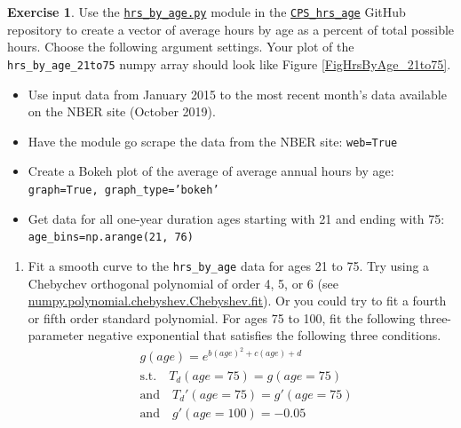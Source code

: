 \documentclass[letterpaper,12pt]{article}
\theoremstyle{definition}
\newtheorem{exercise}[theorem]{Exercise}
\begin{document}
  \begin{exercise}\label{ExCPShrs}
    Use the \href{https://github.com/OpenSourceEcon/CPS_hrs_age/blob/master/hrs_by_age.py}{\texttt{hrs\_by\_age.py}} module in the \href{https://github.com/OpenSourceEcon/CPS_hrs_age}{\texttt{CPS\_hrs\_age}} GitHub repository to create a vector of average hours by age as a percent of total possible hours. Choose the following argument settings. Your plot of the \texttt{hrs\_by\_age\_21to75} numpy array should look like Figure \ref{FigHrsByAge_21to75}.
    \begin{itemize}
      \item Use input data from January 2015 to the most recent month's data available on the NBER site (October 2019).
      \item Have the module go scrape the data from the NBER site: \texttt{web=True}
      \item Create a Bokeh plot of the average of average annual hours by age: \texttt{graph=True, graph\_type='bokeh'}
      \item Get data for all one-year duration ages starting with 21 and ending with 75: \texttt{age\_bins=np.arange(21, 76)}
    \end{itemize}
    \begin{enumerate}
      \item Fit a smooth curve to the \texttt{hrs\_by\_age} data for ages 21 to 75. Try using a Chebychev orthogonal polynomial of order 4, 5, or 6 (see \href{https://docs.scipy.org/doc/numpy/reference/generated/numpy.polynomial.chebyshev.Chebyshev.fit.html#numpy.polynomial.chebyshev.Chebyshev.fit}{numpy.polynomial.chebyshev.Chebyshev.fit}). Or you could try to fit a fourth or fifth order standard polynomial. For ages 75 to 100, fit the following three-parameter negative exponential that satisfies the following three conditions.
      \begin{align}
        &g(age) = e^{b(age)^2 + c(age) + d} \\
        &\text{s.t.}\quad T_d(age=75) = g(age=75) \\
        &\text{and}\quad T_d'(age=75) = g'(age=75) \\
        &\text{and}\quad g'(age=100) = -0.05
      \end{align}
    \end{enumerate}
  \end{exercise}
\end{document}
